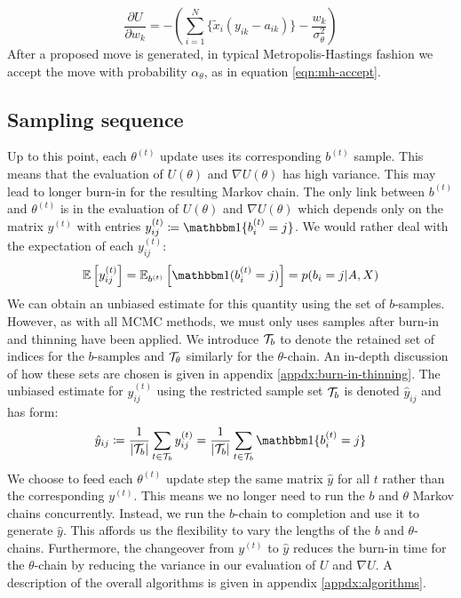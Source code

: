 %
\begin{equation}
	\frac{\partial U}{\partial w_k} = - \left( \sum_{i=1}^{N} \Big\{ \tilde{x}_i (y_{ik} - a_{ik}) \Big\} - \frac{w_k}{\sigma_\theta^2} \right)
	\label{eqn:U-derivative}
\end{equation}
%
After a proposed move is generated, in typical Metropolis-Hastings fashion we accept the move with probability $\alpha_\theta$, as in equation \ref{eqn:mh-accept}.

\subsection{Sampling sequence}

Up to this point, each $\theta^{(t)}$ update uses its corresponding $b^{(t)}$ sample. This means that the evaluation of $U(\theta)$ and $\nabla U(\theta)$ has high variance. This may lead to longer burn-in for the resulting Markov chain. The only link between $b^{(t)}$ and $\theta^{(t)}$ is in the evaluation of $U(\theta)$ and $\nabla U(\theta)$ which depends only on the matrix $y^{(t)}$ with entries $y_{ij}^{(t)} \coloneqq \one\{b_i^{(t)} = j\}$. We would rather deal with the expectation of each $y_{ij}^{(t)}$:
%
\begin{equation}
	\Expect \left[ y_{ij}^{(t)} \right] = \Expect_{b^{(t)}} \left[ \one(b_{i}^{(t)} = j) \right]
	= p(b_i = j | A, X)
\end{equation}
%
We can obtain an unbiased estimate for this quantity using the set of $b$-samples. However, as with all MCMC methods, we must only uses samples after burn-in and thinning have been applied. We introduce $\mathcal{T}_b$ to denote the retained set of indices for the $b$-samples and $\mathcal{T}_\theta$ similarly for the $\theta$-chain. An in-depth discussion of how these sets are chosen is given in appendix \ref{appdx:burn-in-thinning}. The unbiased estimate for $y_{ij}^{(t)}$ using the restricted sample set $\mathcal{T}_b$ is denoted $\hat{y}_{ij}$ and has form:
%
\begin{equation}
	\hat{y}_{ij} \coloneqq \frac{1}{|\Tcal_b|} \sum_{t \in \Tcal_b} y_{ij}^{(t)} = \frac{1}{|\Tcal_b|} \sum_{t \in \Tcal_b} \one\{b_i^{(t)} = j\}
\end{equation}
%
We choose to feed each $\theta^{(t)}$ update step the same matrix $\hat{y}$ for all $t$ rather than the corresponding $y^{(t)}$. This means we no longer need to run the $b$ and $\theta$ Markov chains concurrently. Instead, we run the $b$-chain to completion and use it to generate $\hat{y}$. This affords us the flexibility to vary the lengths of the $b$ and $\theta$-chains. Furthermore, the changeover from $y^{(t)}$ to $\hat{y}$ reduces the burn-in time for the $\theta$-chain by reducing the variance in our evaluation of $U$ and $\nabla U$. A description of the overall algorithms is given in appendix \ref{appdx:algorithms}.


